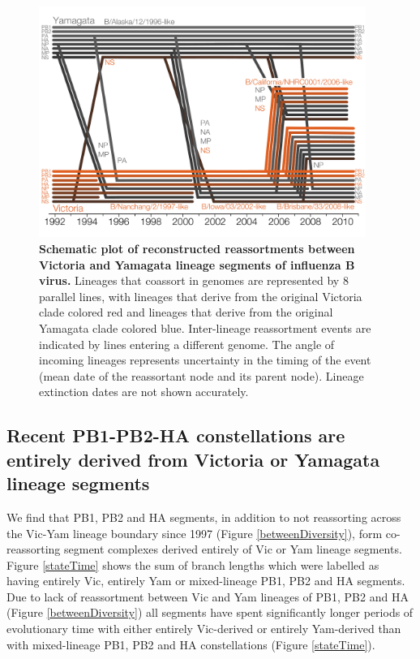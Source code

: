 \documentclass[11pt,oneside,letterpaper]{article}
\begin{document}
\begin{figure}[h]
	\centering		
	\includegraphics[width=0.95\textwidth]{figures/RailroadPlotDated.pdf}
	\caption{\textbf{Schematic plot of reconstructed reassortments between Victoria and Yamagata lineage segments of influenza B virus.}
Lineages that coassort in genomes are represented by 8 parallel lines, with lineages that derive from the original Victoria clade colored red and lineages that derive from the original Yamagata clade colored blue.
Inter-lineage reassortment events are indicated by lines entering a different genome.
The angle of incoming lineages represents uncertainty in the timing of the event (mean date of the reassortant node and its parent node).
Lineage extinction dates are not shown accurately.}
	\label{railroadPlot}
\end{figure}

\subsection*{Recent PB1-PB2-HA constellations are entirely derived from Victoria or Yamagata lineage segments}

We find that PB1, PB2 and HA segments, in addition to not reassorting across the Vic-Yam lineage boundary since 1997 (Figure \ref{betweenDiversity}), form co-reassorting segment complexes derived entirely of Vic or Yam lineage segments.
Figure \ref{stateTime} shows the sum of branch lengths which were labelled as having entirely Vic, entirely Yam or mixed-lineage PB1, PB2 and HA segments.
Due to lack of reassortment between Vic and Yam lineages of PB1, PB2 and HA (Figure \ref{betweenDiversity}) all segments have spent significantly longer periods of evolutionary time with either entirely Vic-derived or entirely Yam-derived than with mixed-lineage PB1, PB2 and HA constellations (Figure \ref{stateTime}).
\end{document}
